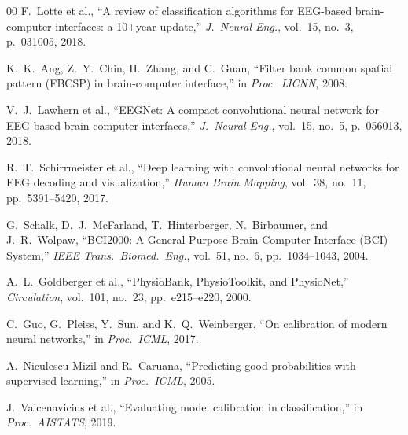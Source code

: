 \documentclass[conference]{IEEEtran}
\begin{document}
\begin{thebibliography}{00}
F.\ Lotte et al.,
``A review of classification algorithms for EEG-based brain-computer interfaces:
a 10+year update,''
\textit{J.\ Neural Eng.}, vol.\ 15, no.\ 3, p.\ 031005, 2018.

K.\ K.\ Ang, Z.\ Y.\ Chin, H.\ Zhang, and C.\ Guan,
``Filter bank common spatial pattern (FBCSP) in brain-computer interface,''
in \textit{Proc.\ IJCNN}, 2008.

V.\ J.\ Lawhern et al.,
``EEGNet: A compact convolutional neural network for EEG-based brain-computer interfaces,''
\textit{J.\ Neural Eng.}, vol.\ 15, no.\ 5, p.\ 056013, 2018.

R.\ T.\ Schirrmeister et al.,
``Deep learning with convolutional neural networks for EEG decoding and visualization,''
\textit{Human Brain Mapping}, vol.\ 38, no.\ 11, pp.\ 5391--5420, 2017.

G.\ Schalk, D.\ J.\ McFarland, T.\ Hinterberger, N.\ Birbaumer, and J.\ R.\ Wolpaw,
``BCI2000: A General-Purpose Brain-Computer Interface (BCI) System,''
\textit{IEEE Trans.\ Biomed.\ Eng.}, vol.\ 51, no.\ 6, pp.\ 1034--1043, 2004.

A.\ L.\ Goldberger et al.,
``PhysioBank, PhysioToolkit, and PhysioNet,''
\textit{Circulation}, vol.\ 101, no.\ 23, pp.\ e215--e220, 2000.

C.\ Guo, G.\ Pleiss, Y.\ Sun, and K.\ Q.\ Weinberger,
``On calibration of modern neural networks,''
in \textit{Proc.\ ICML}, 2017.

A.\ Niculescu-Mizil and R.\ Caruana,
``Predicting good probabilities with supervised learning,''
in \textit{Proc.\ ICML}, 2005.

J.\ Vaicenavicius et al.,
``Evaluating model calibration in classification,''
in \textit{Proc.\ AISTATS}, 2019.

\end{thebibliography}
\end{document}
